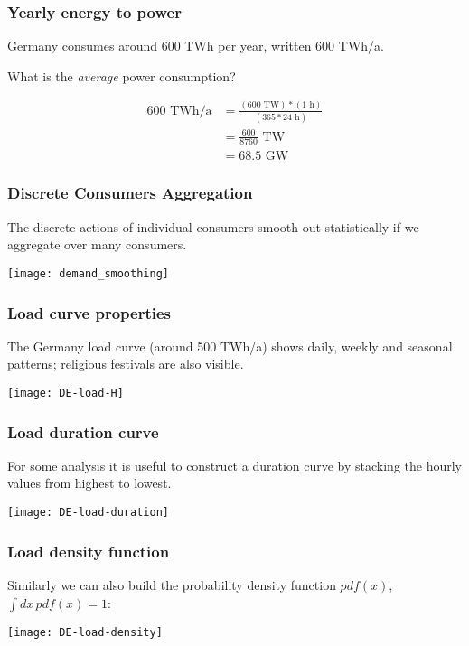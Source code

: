 \documentclass[10pt,aspectratio=169,dvipsnames]{beamer}
\begin{document}
\begin{frame}
  \frametitle{Yearly energy to power}

  Germany consumes around 600 TWh per year, written 600 TWh/a.

  What is the \emph{average} power consumption?

  \begin{align*}
    600\textrm{ TWh/a} & = \frac{(600\textrm{ TW}) * (1\textrm{ h})}{(365*24 \textrm{ h})} \\
    & =  \frac{600}{8760} \textrm{ TW} \\
    & = 68.5 \textrm{ GW}
  \end{align*}

\end{frame}



\begin{frame}
  \frametitle{Discrete Consumers Aggregation}

  The discrete actions of individual consumers smooth out
  statistically if we aggregate over many consumers.

  \centering
  \texttt{[image: demand\_smoothing]}

\end{frame}


\begin{frame}
  \frametitle{Load curve properties}

  The Germany load curve (around 500 TWh/a) shows \alert{daily}, \alert{weekly} and
  \alert{seasonal} patterns; religious festivals are also visible.

  \centering
  \texttt{[image: DE-load-H]}

\end{frame}



\begin{frame}
  \frametitle{Load duration curve}

  For some analysis it is useful to construct a \alert{duration curve}
  by stacking the hourly values from highest to lowest.

  \centering
  \texttt{[image: DE-load-duration]}

\end{frame}




\begin{frame}
  \frametitle{Load density function}

  Similarly we can also build the \alert{probability density function} $pdf(x)$, $\int dx \, pdf(x) = 1$:

  \centering
  \texttt{[image: DE-load-density]}

\end{frame}
\end{document}
